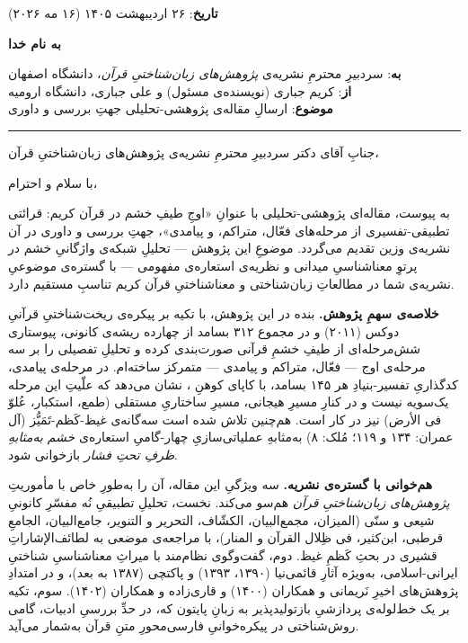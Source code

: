 \documentclass[12pt,a4paper]{article}
\begin{document}
\begin{flushright}\small
\textbf{تاریخ}: ۲۶ اردیبهشت ۱۴۰۵ (۱۶ مه ۲۰۲۶)
\end{flushright}

\begin{center}\large\bfseries
به نام خدا
\end{center}

\vspace{0.4em}

\noindent\textbf{به}: سردبیرِ محترمِ نشریه‌ی \emph{پژوهش‌های زبان‌شناختیِ قرآن}، دانشگاه اصفهان\\
\textbf{از}: کریم جباری (نویسنده‌ی مسئول) و علی جباری، دانشگاه ارومیه\\
\textbf{موضوع}: ارسالِ مقاله‌ی پژوهشی-تحلیلی جهتِ بررسی و داوری

\vspace{0.4em}\hrule\vspace{0.6em}

\noindent جنابِ آقای دکتر سردبیرِ محترمِ نشریه‌ی پژوهش‌های زبان‌شناختیِ قرآن،

\noindent با سلام و احترام،

به پیوست، مقاله‌ای پژوهشی-تحلیلی با عنوانِ «اوجِ طیفِ خشم در قرآن کریم: قرائتی تطبیقی-تفسیری از مرحله‌های فعّال، متراکم، و پیامدی»، جهتِ بررسی و داوری در آن نشریه‌ی وزین تقدیم می‌گردد. موضوعِ این پژوهش --- تحلیلِ شبکه‌ی واژگانیِ خشم در پرتوِ معناشناسیِ میدانی و نظریه‌ی استعاره‌ی مفهومی --- با گستره‌ی موضوعیِ نشریه‌ی شما در مطالعاتِ زبان‌شناختی و معناشناختیِ قرآن کریم تناسبِ مستقیم دارد.

\textbf{خلاصه‌ی سهمِ پژوهش.} بنده در این پژوهش، با تکیه بر پیکره‌ی ریخت‌شناختیِ قرآنیِ دوکس (۲۰۱۱) و در مجموع ۳۱۲ بسامد از چهارده ریشه‌ی کانونی، پیوستاری شش‌مرحله‌ای از طیفِ خشمِ قرآنی صورت‌بندی کرده و تحلیلِ تفصیلی را بر سه مرحله‌ی اوج --- فعّال، متراکم و پیامدی --- متمرکز ساخته‌ام. در مرحله‌ی پیامدی، کدگذاریِ تفسیر-بنیادِ هر ۱۴۵ بسامد، با کاپای کوهنِ ، نشان می‌دهد که علّیتِ این مرحله یک‌سویه نیست و در کنارِ مسیرِ هیجانی، مسیرِ ساختاریِ مستقلی (طمع، استکبار، عُلوّ فی الأرض) نیز در کار است. هم‌چنین تلاش شده است سه‌گانه‌ی غیظ-کَظم-تَمَیُّز (آل عمران: ۱۳۴ و ۱۱۹؛ مُلک: ۸) به‌مثابهِ عملیاتی‌سازیِ چهار-گامیِ استعاره‌ی \emph{خشم به‌مثابهِ ظرفِ تحتِ فشار} بازخوانی شود.

\textbf{هم‌خوانی با گستره‌ی نشریه.} سه ویژگیِ این مقاله، آن را به‌طورِ خاص با مأموریتِ \emph{پژوهش‌های زبان‌شناختیِ قرآن} هم‌سو می‌کند. نخست، تحلیلِ تطبیقیِ نُه مفسّرِ کانونیِ شیعی و سنّی (المیزان، مجمع‌البیان، الکشّاف، التحریر و التنویر، جامع‌البیان، الجامعِ قرطبی، ابن‌کثیر، فی ظِلال القرآن و المنار)، با مراجعه‌ی موضعی به لطائف‌الإشاراتِ قشیری در بحثِ کَظمِ غیظ. دوم، گفت‌وگوی نظام‌مند با میراثِ معناشناسیِ شناختیِ ایرانی-اسلامی، به‌ویژه آثارِ قائمی‌نیا (۱۳۹۰، ۱۳۹۳) و پاکتچی (۱۳۸۷ به بعد)، و در امتدادِ پژوهش‌های اخیرِ نَریمانی و همکاران (۱۴۰۰) و قاری‌زاده و همکاران (۱۴۰۲). سوم، تکیه بر یک خط‌لوله‌ی پردازشیِ بازتولیدپذیر به زبانِ پایتون که، در حدِّ بررسیِ ادبیات، گامی روش‌شناختی در پیکره‌خوانیِ فارسی‌محورِ متنِ قرآن به‌شمار می‌آید.
\end{document}
